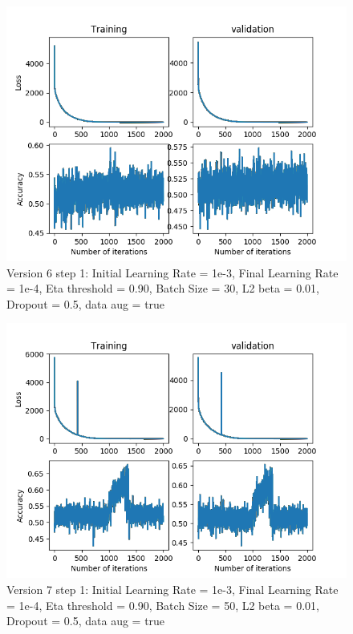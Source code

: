 \documentclass[12pt,reqno]{amsart}
\numberwithin{equation}{section}
\begin{document}
\begin{enumerate}
\begin{figure}[H]
\centering
\includegraphics[scale=0.6]{data_liquid155_version6_step1}
\caption{Version 6 step 1: Initial Learning Rate = 1e-3, Final Learning Rate = 1e-4, Eta threshold = 0.90, Batch Size = 30, L2 beta = 0.01, Dropout = 0.5, data aug = true}
\end{figure}

\begin{figure}[H]
\centering
\includegraphics[scale=0.6]{data_liquid155_version7_step1}
\caption{Version 7 step 1: Initial Learning Rate = 1e-3, Final Learning Rate = 1e-4, Eta threshold = 0.90, Batch Size = 50, L2 beta = 0.01, Dropout = 0.5, data aug = true}
\end{figure}


\end{enumerate}
\end{document}
